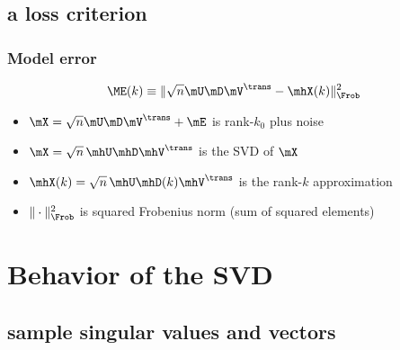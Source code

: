 \documentclass{beamer}
\begin{document}
\subsection{a loss criterion}

\begin{frame}
  \frametitle{Model error}
  \[
    \ME(k) \equiv \| \sqrt{n} \mU \mD \mV^\trans - \mhX(k) \|_\Frob^2
  \]
  \begin{itemize}
    \item $\mX = \sqrt{n} \mU \mD \mV^\trans + \mE$ is rank-$k_0$ plus noise
    \item $\mX = \sqrt{n} \, \mhU \mhD \mhV^\trans$ is the SVD of $\mX$
    \item $\mhX(k) = \sqrt{n} \, \mhU \mhD(k) \mhV^\trans$ is the rank-$k$ approximation
    \item $\| \cdot \|_\Frob^2$ is squared Frobenius norm (sum of squared elements)
  \end{itemize}
\end{frame}



\section{Behavior of the SVD}

\subsection{sample singular values and vectors}
\end{document}

